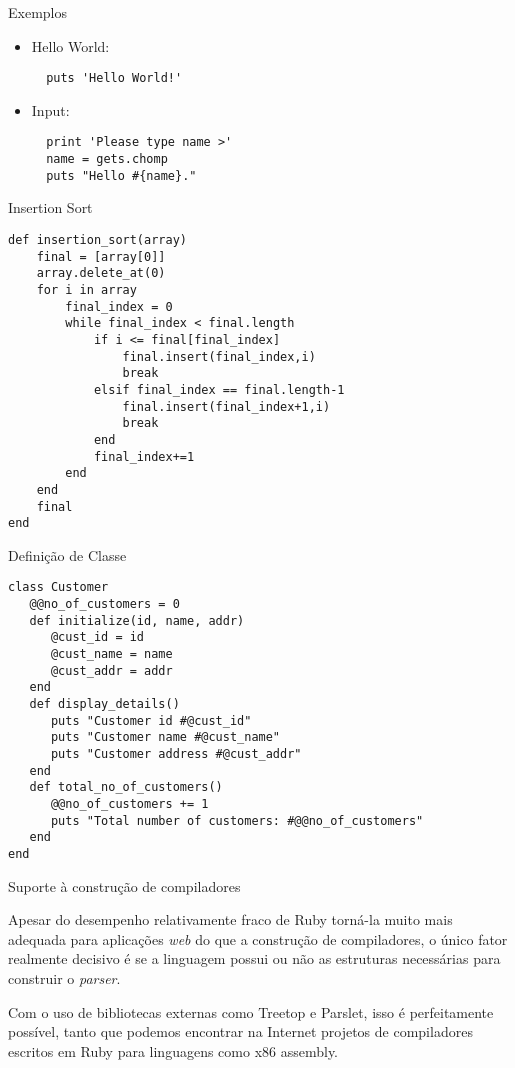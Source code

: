 \documentclass{beamer}
\begin{document}
\begin{frame}[fragile]{Exemplos}
\begin{itemize}
\item Hello World:
\begin{verbatim}
  puts 'Hello World!'
\end{verbatim}
\item Input:
\begin{verbatim}
  print 'Please type name >'
  name = gets.chomp
  puts "Hello #{name}."
\end{verbatim}
\end{itemize}
\end{frame}
\begin{frame}[fragile]{Insertion Sort}
\begingroup
\fontsize{10pt}{11pt}
\begin{verbatim}
def insertion_sort(array)
    final = [array[0]]
    array.delete_at(0)
    for i in array
        final_index = 0
        while final_index < final.length
            if i <= final[final_index]
                final.insert(final_index,i)
                break
            elsif final_index == final.length-1
                final.insert(final_index+1,i)
                break
            end
            final_index+=1
        end
    end
    final
end
\end{verbatim}
\endgroup
\end{frame}
\begin{frame}[fragile]{Definição de Classe}
\begingroup
\fontsize{10pt}{11pt}
\begin{verbatim}
class Customer
   @@no_of_customers = 0
   def initialize(id, name, addr)
      @cust_id = id
      @cust_name = name
      @cust_addr = addr
   end
   def display_details()
      puts "Customer id #@cust_id"
      puts "Customer name #@cust_name"
      puts "Customer address #@cust_addr"
   end
   def total_no_of_customers()
      @@no_of_customers += 1
      puts "Total number of customers: #@@no_of_customers"
   end
end
\end{verbatim}
\endgroup
\end{frame}

\begin{frame}{Suporte à construção de compiladores}

Apesar do desempenho relativamente fraco de Ruby torná-la muito mais adequada para aplicações \textit{web} do que a construção de compiladores, o único fator realmente decisivo é se a linguagem possui ou não as estruturas necessárias para construir o \textit{parser}.

Com o uso de bibliotecas externas como Treetop e Parslet, isso é perfeitamente possível, tanto que podemos encontrar na Internet projetos de compiladores escritos em Ruby para linguagens como x86 assembly.

\end{frame}
\end{document}
